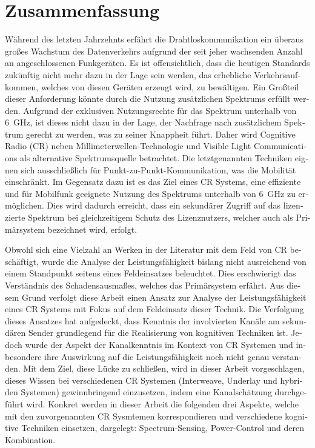 \chapter*{Zusammenfassung}
\begin{otherlanguage}{german}
W\"ahrend des letzten Jahrzehnts erf\"ahrt die Drahtloskommunikation ein \"uberaus gro\ss es Wachstum des Datenverkehrs aufgrund der seit jeher wachsenden Anzahl an angeschlossenen Funkger\"aten. Es ist offensichtlich, dass die heutigen Standards zuk\"unftig nicht mehr dazu in der Lage sein werden, das erhebliche Verkehrsaufkommen, welches von diesen Ger\"aten erzeugt wird, zu bew\"altigen. Ein Gro\ss teil dieser Anforderung k\"onnte durch die Nutzung zus\"atzlichen Spektrums erf\"ullt werden. Aufgrund der exklusiven Nutzungsrechte f\"ur das Spektrum unterhalb von \SI{6}{GHz}, ist dieses nicht dazu in der Lage, der Nachfrage nach zus\"atzlichem Spektrum gerecht zu werden, was zu seiner Knappheit f\"uhrt. Daher wird Cognitive Radio (CR) neben Millimeterwellen-Technologie und Visible Light Communications als alternative Spektrumsquelle betrachtet. Die letztgenannten Techniken eignen sich ausschlie\ss lich f\"ur Punkt-zu-Punkt-Kommunikation, was die Mobilit\"at einschr\"ankt. Im Gegensatz dazu ist es das Ziel eines CR Systems, eine effiziente und f\"ur Mobilfunk geeignete Nutzung des Spektrums unterhalb von \SI{6}{GHz} zu erm\"oglichen. Dies wird dadurch erreicht, dass ein sekund\"arer Zugriff auf das lizenzierte Spektrum bei gleichzeitigem Schutz des Lizenznutzers, welcher auch als Prim\"arsystem bezeichnet wird, erfolgt. 

Obwohl sich eine Vielzahl an Werken in der Literatur mit dem Feld von CR besch\"aftigt, wurde die Analyse der Leistungsf\"ahigkeit bislang nicht ausreichend von einem Standpunkt seitens eines Feldeinsatzes beleuchtet. Dies erschwierigt das Verst\"andnis des Schadensausma\ss es, welches das Prim\"arsystem erf\"ahrt. Aus diesem Grund verfolgt diese Arbeit einen Ansatz zur Analyse der Leistungsf\"ahigkeit eines CR Systems mit Fokus auf dem Feldeinsatz dieser Technik. Die Verfolgung dieses Ansatzes hat aufgedeckt, dass Kenntnis der involvierten Kan\"ale am sekund\"aren Sender grundlegend f\"ur die Realisierung von kognitiven Techniken ist. Jedoch wurde der Aspekt der Kanalkenntnis im Kontext von CR Systemen und inbesondere ihre Auswirkung auf die Leistungsf\"ahigkeit noch nicht genau verstanden. Mit dem Ziel, diese L\"ucke zu schlie\ss en, wird in dieser Arbeit vorgeschlagen, dieses Wissen bei verschiedenen CR Systemen (Interweave, Underlay und hybriden Systemen) gewinnbringend einzusetzen, indem eine Kanalsch\"atzung durchgef\"uhrt wird. Konkret werden in dieser Arbeit die folgenden drei Aspekte, welche mit den zuvorgenannten CR Sysmtemen korrespondieren und verschiedene kognitive Techniken einsetzen, dargelegt: Spectrum-Sensing, Power-Control und deren Kombination.


\end{otherlanguage}
